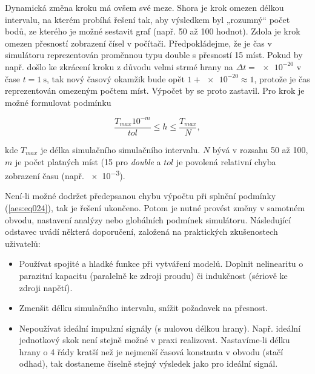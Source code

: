       

      Dynamická změna kroku má ovšem své meze. Shora je krok omezen délkou intervalu, na kterém
      probíhá řešení tak, aby výsledkem byl „rozumný“ počet bodů, ze kterého je možné sestavit graf
      (např. \num{50} až \num{100} hodnot). Zdola je krok omezen přesností zobrazení čísel v
      počítači. Předpokládejme, že je čas v simulátoru reprezentován proměnnou typu double s
      přesností \num{15} míst. Pokud by např. došlo ke zkrácení kroku z důvodu velmi strmé hrany na
      \(\Delta t = \num{e-20}\) v čase \(t = \SI{1}{\second}\), tak nový časový okamžik bude opět
      \(\num{1} + \num{e-20} \approx 1\), protože je čas reprezentován omezeným počtem míst. Výpočet
      by se proto zastavil. Pro krok je možné formulovat podmínku

      \begin{equation}\label{aes:eq024}
        \frac{T_{max}10^{-m}}{tol} \leq h \leq \frac{T_{max}}{N}, 
      \end{equation}

      kde \(T_{max}\) je délka simulačního simulačního intervalu. \(N\) bývá v rozsahu \num{50} až
      \num{100}, \(m\) je počet platných míst (\num{15} pro \emph{double} a \(tol\) je povolená
      relativní chyba zobrazení času (např. \num{e-3}).

      Není-li možné dodržet předepsanou chybu výpočtu při splnění podmínky (\ref{aes:eq024}), tak je
      řešení ukončeno. Potom je nutné provést změny v samotném obvodu, nastavení analýzy nebo
      globálních podmínek simulátoru. Následující odstavec uvádí některá doporučení, založená na
      praktických zkušenostech uživatelů:

      \begin{tcnote}
        \begin{itemize}[noitemsep]
          \item Používat spojité a hladké funkce při vytváření modelů. Doplnit nelinearitu o
                parazitní kapacitu (paralelně ke zdroji proudu) či indukčnost (sériově ke zdroji
                napětí).
          \item Zmenšit délku simulačního intervalu, snížit požadavek na přesnost. 
          \item Nepoužívat ideální impulzní signály (s nulovou délkou hrany). Např. ideální
                jednotkový skok není stejně možné v praxi realizovat. Nastavíme-li délku hrany o
                \num{4} řády kratší než je nejmenší časová konstanta v obvodu (stačí odhad), tak
                dostaneme číselně stejný výsledek jako pro ideální signál.
        \end{itemize}
      \end{tcnote}

